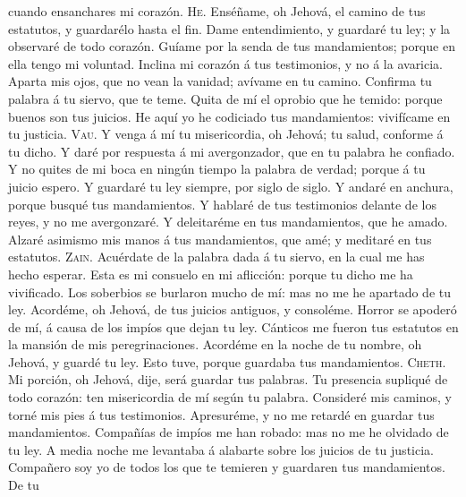cuando ensanchares mi corazón.  \textsc{He}. Enséñame, oh
Jehová, el camino de tus estatutos, y guardarélo hasta el fin.
 Dame entendimiento, y guardaré tu ley; y la observaré de
todo corazón.  Guíame por la senda de tus mandamientos;
porque en ella tengo mi voluntad.  Inclina mi corazón á
tus testimonios, y no á la avaricia.  Aparta mis ojos,
que no vean la vanidad; avívame en tu camino.  Confirma
tu palabra á tu siervo, que te teme.  Quita de mí el
oprobio que he temido: porque buenos son tus juicios.  He
aquí yo he codiciado tus mandamientos: vivifícame en tu justicia.
 \textsc{Vau}. Y venga á mí tu misericordia, oh Jehová;
tu salud, conforme á tu dicho.  Y daré por respuesta á mi
avergonzador, que en tu palabra he confiado.  Y no quites
de mi boca en ningún tiempo la palabra de verdad; porque á tu juicio
espero.  Y guardaré tu ley siempre, por siglo de siglo.
 Y andaré en anchura, porque busqué tus mandamientos.
 Y hablaré de tus testimonios delante de los reyes, y no
me avergonzaré.  Y deleitaréme en tus mandamientos, que
he amado.  Alzaré asimismo mis manos á tus mandamientos,
que amé; y meditaré en tus estatutos.  \textsc{Zain}.
Acuérdate de la palabra dada á tu siervo, en la cual me has hecho
esperar.  Esta es mi consuelo en mi aflicción: porque tu
dicho me ha vivificado.  Los soberbios se burlaron mucho
de mí: mas no me he apartado de tu ley.  Acordéme, oh
Jehová, de tus juicios antiguos, y consoléme.  Horror se
apoderó de mí, á causa de los impíos que dejan tu ley. 
Cánticos me fueron tus estatutos en la mansión de mis peregrinaciones.
 Acordéme en la noche de tu nombre, oh Jehová, y guardé
tu ley.  Esto tuve, porque guardaba tus mandamientos.
 \textsc{Cheth}. Mi porción, oh Jehová, dije, será
guardar tus palabras.  Tu presencia supliqué de todo
corazón: ten misericordia de mí según tu palabra. 
Consideré mis caminos, y torné mis pies á tus testimonios.
 Apresuréme, y no me retardé en guardar tus mandamientos.
 Compañías de impíos me han robado: mas no me he olvidado
de tu ley.  A media noche me levantaba á alabarte sobre
los juicios de tu justicia.  Compañero soy yo de todos
los que te temieren y guardaren tus mandamientos.  De tu
